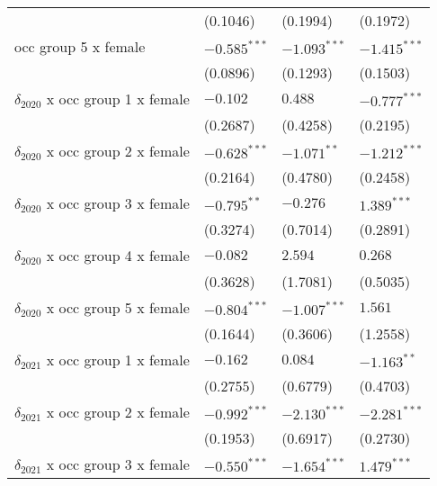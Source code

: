 \begin{tabular}{llll}
                                       &           (0.1046) &           (0.1994) &           (0.1972) \\
occ group 5 x female                   &     $-0.585^{***}$ &     $-1.093^{***}$ &     $-1.415^{***}$ \\
                                       &           (0.0896) &           (0.1293) &           (0.1503) \\
$\delta_{2020}$ x occ group 1 x female &           $-0.102$ &            $0.488$ &     $-0.777^{***}$ \\
                                       &           (0.2687) &           (0.4258) &           (0.2195) \\
$\delta_{2020}$ x occ group 2 x female &     $-0.628^{***}$ &      $-1.071^{**}$ &     $-1.212^{***}$ \\
                                       &           (0.2164) &           (0.4780) &           (0.2458) \\
$\delta_{2020}$ x occ group 3 x female &      $-0.795^{**}$ &           $-0.276$ &      $1.389^{***}$ \\
                                       &           (0.3274) &           (0.7014) &           (0.2891) \\
$\delta_{2020}$ x occ group 4 x female &           $-0.082$ &            $2.594$ &            $0.268$ \\
                                       &           (0.3628) &           (1.7081) &           (0.5035) \\
$\delta_{2020}$ x occ group 5 x female &     $-0.804^{***}$ &     $-1.007^{***}$ &            $1.561$ \\
                                       &           (0.1644) &           (0.3606) &           (1.2558) \\
$\delta_{2021}$ x occ group 1 x female &           $-0.162$ &            $0.084$ &      $-1.163^{**}$ \\
                                       &           (0.2755) &           (0.6779) &           (0.4703) \\
$\delta_{2021}$ x occ group 2 x female &     $-0.992^{***}$ &     $-2.130^{***}$ &     $-2.281^{***}$ \\
                                       &           (0.1953) &           (0.6917) &           (0.2730) \\
$\delta_{2021}$ x occ group 3 x female &     $-0.550^{***}$ &     $-1.654^{***}$ &      $1.479^{***}$ \\

\end{tabular}
